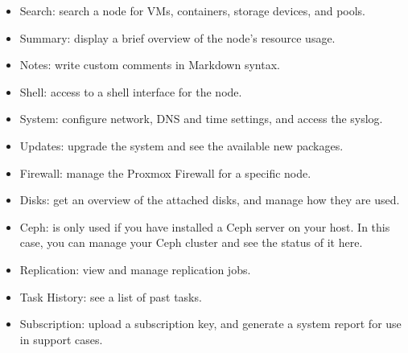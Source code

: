 \begin{itemize}[leftmargin=2cm]

	\item Search: search a node for VMs, containers, storage devices, and pools.

	\item Summary: display a brief overview of the node’s resource usage.

	\item Notes: write custom comments in Markdown syntax.

	\item Shell: access to a shell interface for the node.

	\item System: configure network, DNS and time settings, and access the syslog.

	\item Updates: upgrade the system and see the available new packages.

	\item Firewall: manage the Proxmox Firewall for a specific node.

	\item Disks: get an overview of the attached disks, and manage how they are used.

	\item Ceph: is only used if you have installed a Ceph server on your host. In this case, you can manage your Ceph cluster and see the status of it here.

	\item Replication: view and manage replication jobs.

	\item Task History: see a list of past tasks.

	\item Subscription: upload a subscription key, and generate a system report for use in support cases.

\end{itemize}

